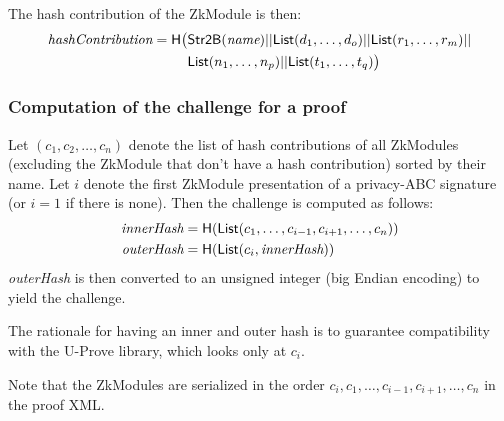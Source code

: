   The hash contribution of the ZkModule is then:
  \begin{align*}
  \textit{hashContribution} = \textsf{H}\big(& \textsf{Str2B}(\textit{name}) || \textsf{List}(d_1, \ldots, d_o) || \textsf{List}(r_1, \ldots, r_m) || \\&
    \textsf{List}(n_1, \ldots, n_p) || \textsf{List}(t_1, \ldots, t_q)\big)
  \end{align*}

  \subsubsection{Computation of the challenge for a proof}
  Let $(c_1, c_2, \ldots, c_n)$ denote the list of hash contributions of all ZkModules
  (excluding the ZkModule that don't have a hash contribution) sorted by their name.
  Let $i$ denote the first ZkModule presentation of a privacy-ABC signature (or $i=1$ if there is none).
  Then the challenge is computed as follows:
  \begin{align*}
  \textit{innerHash} &= \textsf{H}(\textsf{List}(c_1, \ldots, c_{i-1}, c_{i+1}, \ldots, c_n))\\
  \textit{outerHash} &= \textsf{H}(\textsf{List}(c_i, \textit{innerHash}))
  \end{align*}
  \textit{outerHash} is then converted to an unsigned integer (big Endian encoding) to yield the
  challenge.

  The rationale for having an inner and outer hash is to guarantee compatibility with the U-Prove library,
  which looks only at $c_i$.

  Note that the ZkModules are serialized in the order $c_i, c_1, \ldots, c_{i-1}, c_{i+1}, \ldots, c_n$
  in the proof XML.

